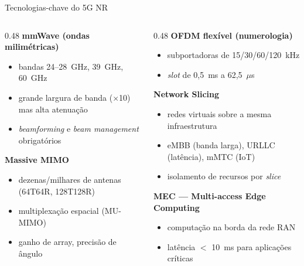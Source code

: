 \documentclass[aspectratio=169,11pt]{beamer}
\begin{document}
\begin{frame}{Tecnologias-chave do 5G NR}
  \begin{columns}
    \begin{column}{0.48\textwidth}
      \textbf{mmWave (ondas milimétricas)}
      \begin{itemize}
        \item bandas 24--28~GHz, 39~GHz, 60~GHz
        \item grande largura de banda ($\times$10) mas alta atenuação
        \item \emph{beamforming} e \emph{beam management} obrigatórios
      \end{itemize}
      \textbf{Massive MIMO}
      \begin{itemize}
        \item dezenas/milhares de antenas (64T64R, 128T128R)
        \item multiplexação espacial (MU-MIMO)
        \item ganho de array, precisão de ângulo
      \end{itemize}
    \end{column}
    \begin{column}{0.48\textwidth}
      \textbf{OFDM flexível (numerologia)}
      \begin{itemize}
        \item subportadoras de 15/30/60/120~kHz
        \item \emph{slot} de 0,5~ms a 62,5~$\mu$s
      \end{itemize}
      \textbf{Network Slicing}
      \begin{itemize}
        \item redes virtuais sobre a mesma infraestrutura
        \item eMBB (banda larga), URLLC (latência), mMTC (IoT)
        \item isolamento de recursos por \emph{slice}
      \end{itemize}
      \textbf{MEC --- Multi-access Edge Computing}
      \begin{itemize}
        \item computação na borda da rede RAN
        \item latência $<$ 10~ms para aplicações críticas
      \end{itemize}
    \end{column}
  \end{columns}
\end{frame}
\end{document}
